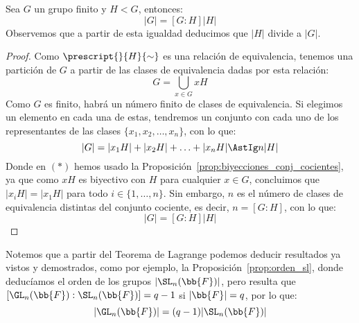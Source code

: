 \begin{teo}[de Lagrange]\label{teo:lagrange} %
    Sea $G$ un grupo finito y $H < G$, entonces:
    \begin{equation*}
        |G| = [G:H]|H|
    \end{equation*}
    Observemos que a partir de esta igualdad deducimos que $|H|$ divide a $|G|$.
    \begin{proof}
        Como $\prescript{}{H}{\sim}$ es una relación de equivalencia, tenemos una partición de $G$ a partir de las clases de equivalencia dadas por esta relación:
        \begin{equation*}
            G = \bigcup_{x\in G} xH
        \end{equation*}
        Como $G$ es finito, habrá un número finito de clases de equivalencia. Si elegimos un elemento en cada una de estas, tendremos un conjunto con cada uno de los representantes de las clases $\{x_1, x_2, \ldots, x_n\}$, con lo que:
        \begin{equation*}
            |G| = |x_1H| + |x_2H| + \ldots + |x_nH| \AstIg n|H|
        \end{equation*}
        Donde en $(\ast)$ hemos usado la Proposición~\ref{prop:biyecciones_conj_cocientes}, ya que como $xH$ es biyectivo con $H$ para cualquier $x\in G$, concluimos que $|x_iH| = |x_1H|$ para todo $i \in \{1,\ldots,n\}$. Sin embargo, $n$ es el número de clases de equivalencia distintas del conjunto cociente, es decir, $n=[G:H]$, con lo que:
        \begin{equation*}
            |G| = [G:H]|H|
        \end{equation*}
    \end{proof}
\end{teo}

\begin{observacion}
    Notemos que a partir del Teorema de Lagrange podemos deducir resultados ya vistos y demostrados, como por ejemplo, la Proposición~\ref{prop:orden_sl}, donde deducíamos el orden de los grupos $|\SL_n(\bb{F})|$, pero resulta que $[\GL_n(\bb{F}):\SL_n(\bb{F})] = q-1$ si $|\bb{F}| = q$, por lo que:
    \begin{equation*}
        |\GL_n(\bb{F})| = (q-1)|\SL_n(\bb{F})|
    \end{equation*}
\end{observacion}

